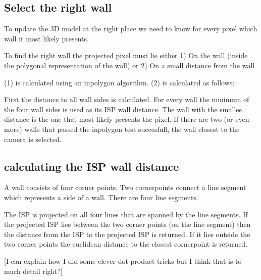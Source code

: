 \subsection{Select the right wall}
To update the 3D model at the right place we need to know for every pixel 
which wall it most likely presents.  

To find the right wall the projected pixel must lie either
1) On the wall (inside the polygonal representation of the wall)
or
2) On a small distance from the wall

(1) is calculated using an inpolygon algorithm.
(2) is calculated as follows:

First the distance to all wall sides is calculated. For every wall the minimum of the four wall sides is used as its ISP wall distance.
The wall with the smalles distance is the one that most likely presents the pixel. If there are two (or even more) walls that passed the inpolygon test succesfull, the wall closest to the camera is selected.

\subsection{calculating the ISP wall distance}
A wall consists of four corner points. Two cornerpoints connect a line segment which represents a side of a wall. There are four line segments.

The ISP is projected on all four lines that are spanned by the line segments.
If the projected ISP lies between the two corner points (on the line segment) then the distance from the ISP to the projected ISP is returned.
If it lies outside the two corner points the euclidean distance to the closest cornerpoint is returned.

[I can explain how I did some clever dot product tricks but I think that is to much detail right?]

